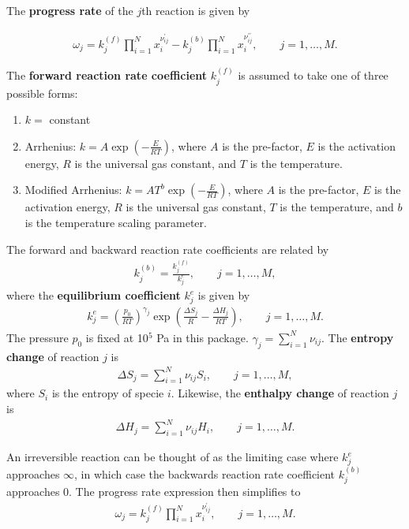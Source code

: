 \documentclass[12pt]{article}
\begin{document}
The \textbf{progress rate} of the $j$th reaction is given by


\begin{align}
\omega_{j} = k_{j}^{\left(f\right)}\prod_{i=1}^{N}{x_{i}^{\nu_{ij}^{\prime}}} - k_{j}^{\left(b\right)}\prod_{i=1}^{N}{x_{i}^{\nu_{ij}^{\prime\prime}}}, \qquad j = 1,\ldots, M.
\end{align}

The \textbf{forward reaction rate coefficient} $k_j^{\left(f\right)}$ is assumed to take one of three possible forms:
\begin{enumerate}
\item $k=$ constant
\item Arrhenius: $k=A\exp(-\frac{E}{RT})$, where $A$ is the pre-factor, $E$ is the activation energy, $R$ is the universal gas constant, and $T$ is the temperature.
\item Modified Arrhenius: $k=AT^b\exp(-\frac{E}{RT})$, where $A$ is the pre-factor, $E$ is the activation energy, $R$ is the universal gas constant, $T$ is the temperature, and $b$ is the temperature scaling parameter.
\end{enumerate}

The forward and backward reaction rate coefficients are related by 
\begin{align}
k_{j}^{\left(b\right)} = \frac{k_{j}^{\left(f\right)}}{k_{j}^{e}}, \qquad j =1, \ldots, M,
\end{align}
where the \textbf{equilibrium coefficient} $k_{j}^{e}$ is given by 
\begin{align}
k_{j}^{e} = \left(\frac{p_{0}}{RT}\right)^{\gamma_{j}}\exp\left(\frac{\Delta S_{j}}{R} - \frac{\Delta H_{j}}{RT}\right), \qquad j =1, \ldots, M.
\end{align}
The pressure $p_0$ is fixed at 10$^5$ Pa in this package. $\gamma_{j} = \sum_{i=1}^{N}{\nu_{ij}}$. The \textbf{entropy change} of reaction $j$ is  
\begin{align}
\Delta S_{j} = \sum_{i=1}^{N}{\nu_{ij}S_{i}}, \qquad j =1, \ldots, M,
\end{align}
where $S_i$ is the entropy of specie $i.$ Likewise, the \textbf{enthalpy change} of reaction $j$ is 
\begin{align}
\Delta H_{j} = \sum_{i=1}^{N}{\nu_{ij}H_{i}}, \qquad j =1, \ldots, M. 
\end{align}

An irreversible reaction can be thought of as the limiting case where $k_{j}^{e}$ approaches $\infty$, in which case the backwards reaction rate coefficient $k_{j}^{\left(b\right)}$ approaches 0. The progress rate expression then simplifies to 
\begin{align}
\omega_{j} = k_{j}^{\left(f\right)}\prod_{i=1}^{N}{x_{i}^{\nu_{ij}^{\prime}}}, \qquad j = 1,\ldots, M.
\end{align}
\end{document}

